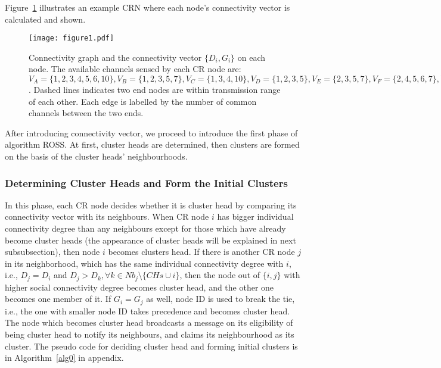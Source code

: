 \documentclass[10pt,journal,compsoc]{IEEEtran}
\theoremstyle{mytheoremstyle}
\theoremstyle{mytheoremstyle}
\theoremstyle{mytheoremstyle}
\newcommand{\ie}{i.e., }
\begin{document}
Figure~\ref{fig1} illustrates an example CRN where each node's connectivity vector is calculated and shown.	
\begin{figure}[ht!]
  \centering
\texttt{[image: figure1.pdf]}
	\caption{Connectivity graph and the connectivity vector $\{D_i, G_i\}$ on each node. The available channels sensed by each CR node are: $V_A=\{1,2,3,4,5,6,10\}, V_B=\{1,2,3,5,7\}, V_C=\{1,3,4,10\}, V_D=\{1,2,3,5\}, V_E=\{2,3,5,7\}, V_F=\{2,4,5,6,7\}, V_G=\{1,2,3,4,8\}, V_H=\{1,2,5,8\}$. Dashed lines indicates two end nodes are within transmission range of each other. Each edge is labelled by the number of common channels between the two ends.}
	\label{fig1}
\end{figure}

After introducing connectivity vector, we proceed to introduce the first phase of algorithm ROSS.
At first, cluster heads are determined, then clusters are formed on the basis of the cluster heads' neighbourhoods.


\subsubsection{Determining Cluster Heads and Form the Initial Clusters}
In this phase, each CR node decides whether it is cluster head by comparing its connectivity vector with its neighbours.
When CR node $i$ has bigger individual connectivity degree than any neighbours except for those which have already become cluster heads (the appearance of cluster heads will be explained in next subsubsection), then node $i$ becomes clusters head.
If there is another CR node $j$ in its neighborhood, which has the same individual connectivity degree with $i$, \ie $D_j = D_i$ and $D_j > D_{k}, \forall k\in Nb_j\setminus \{CHs\cup i\}$, then the node out of $\{i, j\}$ with higher social connectivity degree becomes cluster head, and the other one becomes one member of it. 
If $G_i = G_j$ as well, node ID is used to break the tie, \ie the one with smaller node ID takes precedence and becomes cluster head.
%
The node which becomes cluster head broadcasts a message on its eligibility of being cluster head to notify its neighbours, and claims its neighbourhood as its cluster.
The pseudo code for deciding cluster head and forming initial clusters is in Algorithm~\ref{alg0} in appendix.
\end{document}
